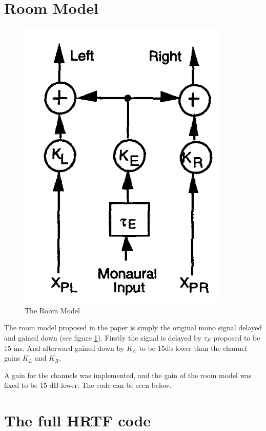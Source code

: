 \documentclass{assignment}
\begin{document}


\section*{Room Model}

\begin{figure}[h]
    \centering
    \includegraphics[scale = 0.7]{assets/mono.png}
    \caption{The Room Model}
    \label{fig:roomModel}
\end{figure}

The room model proposed in the paper is simply the original mono signal delayed and gained down (see figure \ref{fig:roomModel}). Firstly the signal is delayed by $\tau_{E}$ proposed to be 15 ms. And afterward gained down by $K_{E}$ to be 15db lower than the channel gains $K_{L}$ and $K_{R}$. \newline

A gain for the channels was implemented, and the gain of the room model was fixed to be 15 dB lower. The code can be seen below. 



\section{The full HRTF code}
\end{document}
